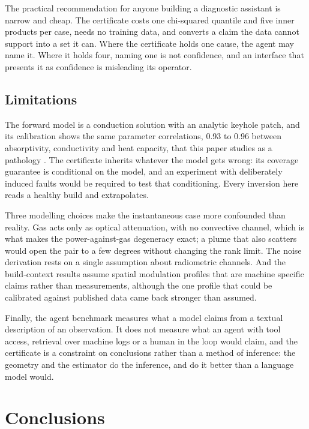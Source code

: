 \documentclass[preprint,12pt]{elsarticle}
\begin{document}
The practical recommendation for anyone building a diagnostic assistant is
narrow and cheap. The certificate costs one chi-squared quantile and five inner
products per case, needs no training data, and converts a claim the data cannot
support into a set it can. Where the certificate holds one cause, the agent may
name it. Where it holds four, naming one is not confidence, and an interface
that presents it as confidence is misleading its operator.

\subsection{Limitations}

The forward model is a conduction solution with an analytic keyhole patch, and
its calibration shows the same parameter correlations, 0.93 to 0.96 between
absorptivity, conductivity and heat capacity, that this paper studies as a
pathology \cite{Hon2021}. The certificate inherits whatever the model gets
wrong: its coverage guarantee is conditional on the model, and an experiment
with deliberately induced faults would be required to test that conditioning.
Every inversion here reads a healthy build and extrapolates.

Three modelling choices make the instantaneous case more confounded than
reality. Gas acts only as optical attenuation, with no convective channel, which
is what makes the power-against-gas degeneracy exact; a plume that also scatters
would open the pair to a few degrees without changing the rank limit. The noise
derivation rests on a single assumption about radiometric channels. And the
build-context results assume spatial modulation profiles that are machine
specific claims rather than measurements, although the one profile that could be
calibrated against published data came back stronger than assumed.

Finally, the agent benchmark measures what a model claims from a textual
description of an observation. It does not measure what an agent with tool
access, retrieval over machine logs or a human in the loop would claim, and the
certificate is a constraint on conclusions rather than a method of inference:
the geometry and the estimator do the inference, and do it better than a
language model would.

\section{Conclusions}
\label{sec:conclusions}
\end{document}
